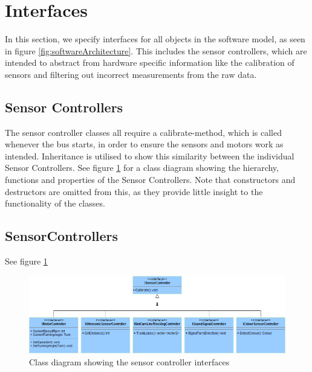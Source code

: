 \section{Interfaces}



In this section, we specify interfaces for all objects in the software model, as seen in figure \ref{fig:softwareArchitecture}. This includes the sensor controllers, which are intended to abstract from hardware specific information like the calibration of sensors and filtering out incorrect measurements from the raw data. 

\subsection{Sensor Controllers}
The sensor controller classes all require a calibrate-method, which is called whenever the bus starts, in order to ensure the sensors and motors work as intended. Inheritance is utilised to show this similarity between the individual Sensor Controllers. See figure \ref{fig:interfaceSensorControllers} for a class diagram showing the hierarchy, functions and properties of the Sensor Controllers. Note that constructors and destructors are omitted from this, as they provide little insight to the functionality of the classes. 

\subsection{SensorControllers}
See figure \ref{fig:interfaceSensorControllers} 

\begin{figure}[ht]
    \includegraphics[width=\textwidth]{Images/Design/InterfaceSensorControllers.png}
    \caption{Class diagram showing the sensor controller interfaces}
    \label{fig:interfaceSensorControllers}
\end{figure}

